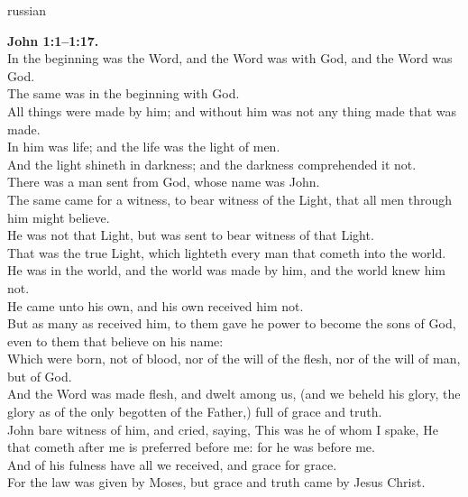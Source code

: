 \documentclass[10pt]{article} %
\begin{document}
{\begin{minipage}[t]{0.45\textwidth}
\begin{otherlanguage*}{russian}
\end{otherlanguage*}
\end{minipage}
\hfill
\begin{minipage}[t]{0.45\textwidth}

\textbf{John 1:1--1:17.}\\
In the beginning was the Word, and the Word was with God, and the Word was God.\\
The same was in the beginning with God.\\
All things were made by him; and without him was not any thing made that was made.\\
In him was life; and the life was the light of men.\\
And the light shineth in darkness; and the darkness comprehended it not.\\
There was a man sent from God, whose name was John.\\
The same came for a witness, to bear witness of the Light, that all men through him might believe.\\
He was not that Light, but was sent to bear witness of that Light.\\
That was the true Light, which lighteth every man that cometh into the world.\\
He was in the world, and the world was made by him, and the world knew him not.\\
He came unto his own, and his own received him not.\\
But as many as received him, to them gave he power to become the sons of God, even to them that believe on his name:\\
Which were born, not of blood, nor of the will of the flesh, nor of the will of man, but of God.\\
And the Word was made flesh, and dwelt among us, (and we beheld his glory, the glory as of the only begotten of the Father,) full of grace and truth.\\
John bare witness of him, and cried, saying, This was he of whom I spake, He that cometh after me is preferred before me: for he was before me.\\
And of his fulness have all we received, and grace for grace.\\
For the law was given by Moses, but grace and truth came by Jesus Christ.\\

\end{minipage}}
\vspace*{\fill}
\newpage
\huge%
\vspace*{\fill}
\end{document}

